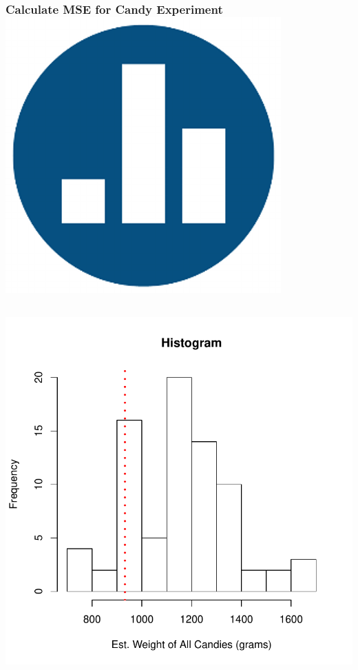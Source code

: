 \documentclass[handout]{beamer}
\begin{document}
\begin{frame}
\frametitle{Calculate MSE for Candy Experiment \hfill \includegraphics[scale = 0.05]{./images/clicker}}


\begin{columns} 

\begin{column}[c]{5cm} 
\centering
\includegraphics[scale = 0.4]{./images/Est_Weight_Candy}
\end{column} 


\end{columns}
\end{frame}
\end{document}

